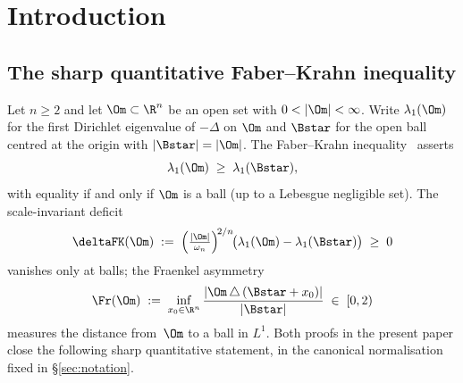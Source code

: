 %
%

\section{Introduction}
\label{sec:intro}

\subsection{The sharp quantitative Faber--Krahn inequality}
\label{ssec:intro-headline}

Let $n\ge 2$ and let $\Om\subset\R^n$ be an open set with
$0<|\Om|<\infty$. Write $\lambda_1(\Om)$ for the first Dirichlet
eigenvalue of $-\Delta$ on $\Om$ and $\Bstar$ for the open ball
centred at the origin with $|\Bstar|=|\Om|$. The Faber--Krahn
inequality~\cite{Faber1923,Krahn1925,Krahn1926} asserts
\begin{equation}\label{eq:intro-FK}
   \lambda_1(\Om)\;\ge\;\lambda_1(\Bstar),
\end{equation}
with equality if and only if $\Om$ is a ball (up to a Lebesgue
negligible set). The scale-invariant deficit
\begin{equation}\label{eq:intro-deltaFK}
   \deltaFK(\Om)\;:=\;
   \Bigl(\tfrac{|\Om|}{\omega_n}\Bigr)^{\!2/n}\!
   \bigl(\lambda_1(\Om)-\lambda_1(\Bstar)\bigr)\;\ge\;0
\end{equation}
vanishes only at balls; the Fraenkel asymmetry
\begin{equation}\label{eq:intro-Fr}
   \Fr(\Om)\;:=\;
   \inf_{x_0\in\R^n}\frac{|\Om\,\triangle\,(\Bstar+x_0)|}{|\Bstar|}
   \;\in\;[0,2)
\end{equation}
measures the distance from~$\Om$ to a ball in $L^1$. Both proofs in
the present paper close the following sharp quantitative statement,
in the canonical normalisation fixed in
\S\ref{sec:notation}.

